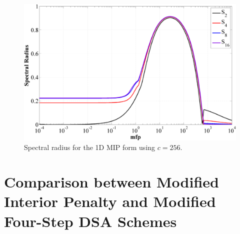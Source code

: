 \begin{figure}
\centering
\includegraphics[width=\textwidth]{figures/appendices/DSA_1D_SI_MIP_C=256.png}
\caption{Spectral radius for the 1D MIP form using $c=256$.}
\label{fig::1D_MIP_c=256}
\end{figure}

\section{Comparison between Modified Interior Penalty and Modified Four-Step DSA Schemes}
\label{sec::App_DSA_M4S}
